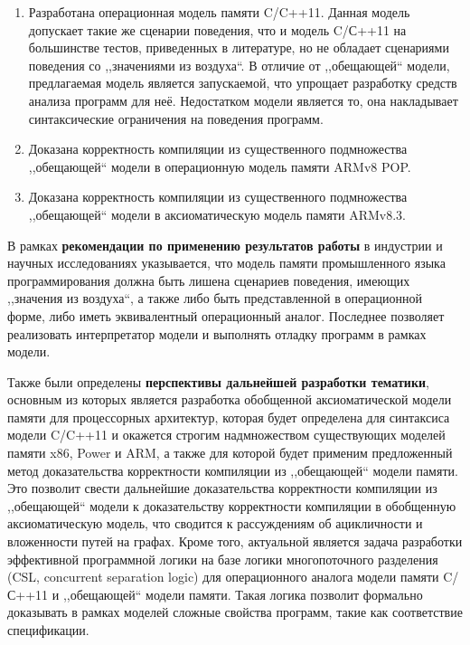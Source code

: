 \begin{enumerate}
  \item Разработана операционная модель памяти C/C++11.
    Данная модель допускает такие же сценарии поведения, что и модель C/С++11 на большинстве
    тестов, приведенных в литературе, но не обладает сценариями поведения со ,,значениями из воздуха``.
    В отличие от ,,обещающей`` модели, предлагаемая модель является запускаемой, что упрощает
    разработку средств анализа программ для неё. Недостатком модели является то,
    она накладывает синтаксические ограничения на поведения программ.
  \item Доказана корректность компиляции из существенного подмножества ,,обещающей`` модели в операционную модель
    памяти ARMv8 POP.
  \item Доказана корректность компиляции из существенного подмножества ,,обещающей`` модели в
    аксиоматическую модель памяти ARMv8.3.
\end{enumerate}

В рамках \textbf{рекомендации по применению результатов работы} в индустрии и научных исследованиях указывается,
что модель памяти промышленного языка программирования должна быть лишена сценариев поведения, имеющих ,,значения из воздуха``,
а также либо быть представленной в операционной форме, либо иметь эквивалентный операционный аналог.
Последнее позволяет реализовать интерпретатор модели и выполнять отладку программ в рамках модели.

Также были определены \textbf{перспективы дальнейшей разработки тематики}, основным из которых является
разработка обобщенной аксиоматической модели памяти для процессорных архитектур, которая будет
определена для синтаксиса модели C/C++11 и окажется строгим надмножеством существующих моделей памяти
x86, Power и ARM, а также для которой будет применим предложенный метод доказательства корректности компиляции
из ,,обещающей`` модели памяти. Это позволит свести дальнейшие доказательства корректности компиляции из
,,обещающей`` модели к доказательству корректности компиляции в обобщенную аксиоматическую модель, что
сводится к рассуждениям об ацикличности и вложенности путей на графах.
Кроме того, актуальной является задача разработки эффективной программной логики на базе логики многопоточного разделения
(CSL, concurrent separation logic) для операционного аналога модели памяти C/С++11 и ,,обещающей`` модели памяти.
Такая логика позволит формально доказывать  в рамках моделей сложные свойства программ, такие как соответствие спецификации.
